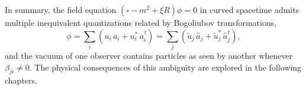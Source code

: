 In summary, the field equation $(\square - m^2 + \xi R)\phi = 0$ in
curved spacetime admits multiple inequivalent quantizations related by
Bogoliubov transformations,
\begin{equation}
	\phi = \sum_i\left(u_i\,a_i + u_i^*\,a_i^\dagger\right)
	= \sum_j\left(\tilde u_j\,\hat a_j
	+ \tilde u_j^*\,\hat a_j^\dagger\right),
\end{equation}
and the vacuum of one observer contains particles as seen by another
whenever $\beta_{ji}\neq 0$. The physical consequences of this
ambiguity are explored in the following chapters.
